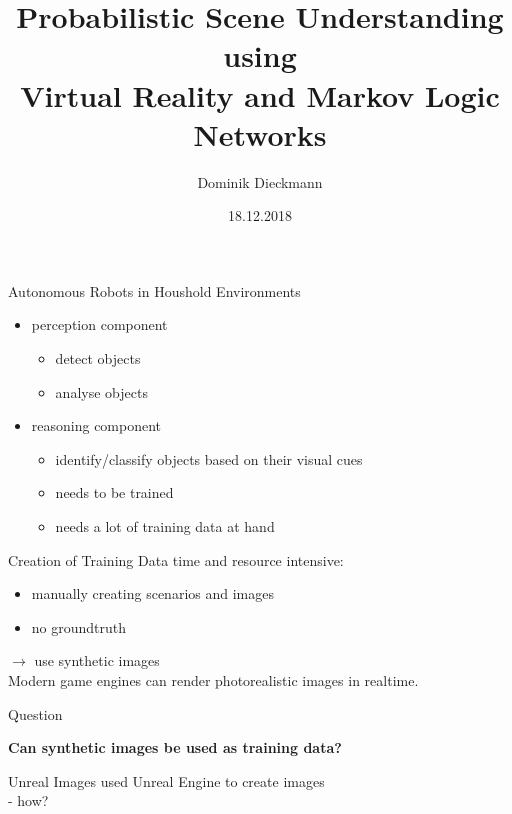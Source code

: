 \documentclass[]{beamer}
\title[Short version]{Probabilistic Scene Understanding using\\ Virtual Reality and Markov Logic Networks}
\subtitle[]{}
\date[]{18.12.2018}
\author[D. Dieckmann]{Dominik Dieckmann}
\institute[Uni Bremen]{Institute for Artificial Intelligence \\ University Bremen}
\begin{document}
\beamertemplatenavigationsymbolsempty

\begin{frame}
	\maketitle
\end{frame}

\begin{frame}{Autonomous Robots in Houshold Environments}
	\begin{itemize}
		\item perception component
			\begin{itemize}
				\item detect objects
				\item analyse objects
			\end{itemize}
		\item reasoning component
			\begin{itemize}
				\item identify/classify objects based on their visual cues
				\item needs to be trained
				\item needs a lot of training data at hand
			\end{itemize}
	\end{itemize}
\end{frame}

\begin{frame}{Creation of Training Data}
time and resource intensive:
	\begin{itemize}
		\item manually creating scenarios and images
		\item no groundtruth
	\end{itemize}
$\rightarrow$ use synthetic images \\[1cm]
Modern game engines can render photorealistic images in realtime.
\end{frame}


\begin{frame}{Question}

\textbf{Can synthetic images be used as training data?}

\end{frame}


\begin{frame}{Unreal Images}
used Unreal Engine to create images\\
- how? 
\end{frame}
\end{document}
